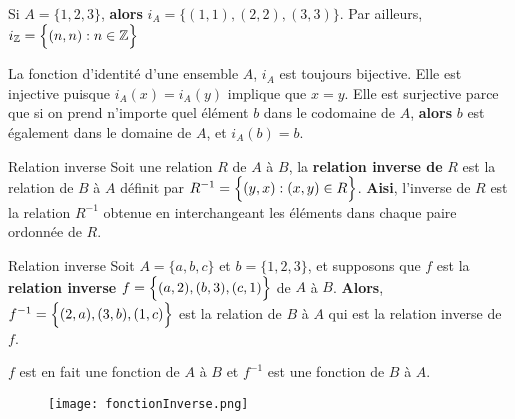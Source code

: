 \documentclass[16pt]{report}
\begin{document}
\begin{multicols*}{2}
            \begin{EExample}{}{}
                Si $A = \{ 1, 2, 3 \}$, \textbf{alors} $i_A = \{(1, 1), (2, 2), (3, 3) \}$. Par ailleurs, 
                $i_{\mathbb{Z}} = \Bigl\{ (n, n) : n \in \mathbb{Z} \Bigr\}$
            \end{EExample}


            \begin{note}{}{}
                La fonction d'identité d'une ensemble $A$, $i_A$ est toujours bijective. Elle est 
                injective puisque $i_A(x) = i_A(y)$ implique que $x = y$. Elle est surjective parce que 
                si on prend n'importe quel élément $b$ dans le codomaine de $A$, \textbf{alors} $b$ est 
                également dans le domaine de $A$, et $i_A(b) = b$. 
            \end{note}


            \begin{Definitionx}{Relation inverse}{}
                Soit une relation $R$ de $A$ à $B$, la \textbf{relation inverse de} $R$ est la relation 
                de $B$ à $A$ définit par $R^{-1} = \Bigl\{ (y, x): (x, y) \in R \Bigr\}$. \textbf{Aisi}, 
                l'inverse de $R$ est la relation $R^{-1}$ obtenue en interchangeant les éléments 
                dans chaque paire ordonnée de $R$. 
            \end{Definitionx}


            \begin{EExample}{Relation inverse}{}
                Soit $A = \{a, b, c\}$ et $b = \{1, 2, 3\}$, et supposons que $f$ est la \textbf{relation inverse} 
                $f = \Bigl\{ (a, 2), (b, 3), (c, 1) \Bigr\}$ de $A$ à $B$. \textbf{Alors}, 
                $f^{-1} = \Bigl\{ (2, a), (3, b), (1, c) \Bigr\}$ est la relation de $B$ à $A$ qui est 
                la relation inverse de $f$. 
            \end{EExample}

            \begin{note}{}{}
                $f$ est en fait une fonction de $A$ à $B$ et $f^{-1}$ est une fonction de $B$ à $A$. 
            \end{note}

            \begin{figure}[H]
                \begin{center}
                    \texttt{[image: fonctionInverse.png]}
                \end{center}
            \end{figure}



\end{multicols*}
\end{document}
